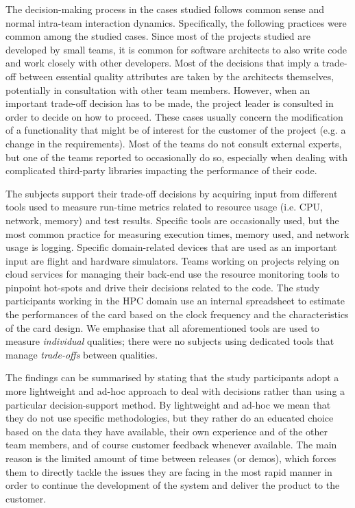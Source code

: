 The decision-making process in the cases studied follows common sense and normal intra-team interaction dynamics. Specifically, the following practices were common among the studied cases.
Since most of the projects studied are developed by small teams, it is common for software architects to also write code and work closely with other developers.
Most of the decisions that imply a trade-off between essential quality attributes are taken by the architects themselves, potentially in consultation with other team members.
However, when an important trade-off decision has to be made, the project leader is consulted in order to decide on how to proceed.
These cases usually concern the modification of a functionality that might be of interest for the customer of the project (e.g. a change in the requirements).
Most of the teams do not consult external experts, but one of the teams reported to occasionally do so, especially when dealing with complicated third-party libraries impacting the performance of their code.

The subjects support their trade-off decisions by acquiring input from different tools used to measure run-time metrics related to resource usage (i.e. CPU, network, memory) and test results. 
Specific tools are occasionally used, but the most common practice for measuring execution times, memory used, and network usage is logging.
Specific domain-related devices that are used as an important input are flight and hardware simulators.
Teams working on projects relying on cloud services for managing their back-end use the resource monitoring tools to pinpoint hot-spots and drive their decisions related to the code.
The study participants working in the HPC domain use an internal spreadsheet to estimate the performances of the card based on the clock frequency and the characteristics of the card design.
We emphasise that all aforementioned tools are used to measure \textit{individual} qualities; there were no subjects using dedicated tools that manage \textit{trade-offs} between qualities.

The findings can be summarised by stating that the study participants adopt a more lightweight and ad-hoc approach to deal with decisions rather than using a particular decision-support method.
By lightweight and ad-hoc we mean that they do not use specific methodologies, but they rather do an educated choice based on the data they have available, their own experience and of the other team members, and of course customer feedback whenever available.
The main reason is the limited amount of time between releases (or demos), which forces them to directly tackle the issues they are facing in the most rapid manner in order to continue the development of the system and deliver the product to the customer.

